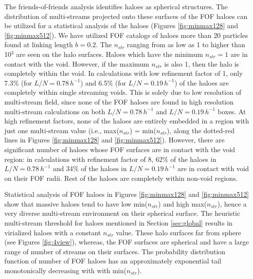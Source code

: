 The friends-of-friends analysis identifies haloes as spherical structures. The distribution of multi-streams projected onto these surfaces of the FOF haloes can be utilized for a statistical analysis of the haloes (Figures \ref{fig:minmax128} and \ref{fig:minmax512}). We have utilized FOF catalogs of haloes more than 20 particles found at linking length $ b= 0.2$.  The $n_{str}$ ranging from as low as 1 to higher than 10$^3$ are seen on the halo surfaces. Haloes which have the minimum $n_{str} = 1$ are in contact with the void. However, if the maximum $n_{str}$ is also 1, then the halo is completely within the void. In calculations with low refinement factor of 1, only 7.3$\%$ (for  $L/N = 0.78 \,h^{-1}$) and 6.5$\%$ (for  $L/N = 0.19 \,h^{-1}$) of the haloes are completely within single streaming voids. This is solely due to low resolution of multi-stream field, since none of the FOF haloes are found in high resolution multi-stream calculations on both $L/N = 0.78 \,h^{-1}$ and $L/N = 0.19 \,h^{-1}$ boxes. At high refinement factors, none of the haloes are entirely embedded in a region with just one multi-stream value (i.e., max($n_{str}$) = min($n_{str}$), along the dotted-red lines in Figures \ref{fig:minmax128} and \ref{fig:minmax512}). However, there are significant number of haloes whose FOF surfaces are in contact with the void region: in calculations with refinement factor of 8, 62$\%$ of the haloes in $L/N = 0.78 \,h^{-1}$ and 34$\%$ of the haloes in $L/N = 0.19 \,h^{-1}$ are in contact with void on their FOF radii. Rest of the haloes are completely within non-void regions.

Statistical analysis of FOF haloes in Figures \ref{fig:minmax128} and \ref{fig:minmax512} show that massive haloes tend to have low min($n_{str}$) and high max($n_{str}$), hence a very diverse multi-stream environment on their spherical surface. The heuristic  multi-stream threshold for haloes mentioned in Section \ref{sec:global} results in virialized haloes with a constant $n_{str}$ value. These halo surfaces far from sphere (see Figures \ref{fig:4view}), whereas, the FOF surfaces are spherical and have a large range of number of streams on their surfaces. The probability distribution function of number of FOF haloes has an approximately exponential tail monotonically decreasing with with min($n_{str}$). 


